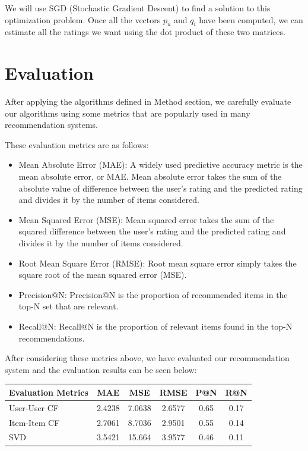 \documentclass[12pt,a4paper]{report}
\begin{document}
  We will use SGD (Stochastic Gradient Descent) to find a solution to this optimization problem. Once all the vectors $p_u$ and $q_i$ have been computed, we can estimate all the ratings we want using the dot product of these two matrices.
  

\chapter{Evaluation}

After applying the algorithms defined in Method section, we carefully evaluate our algorithms using some metrics that are popularly used in many recommendation systems.

These evaluation metrics are as follows: 
\vspace{-5mm}
\begin{itemize}
    \item Mean Absolute Error (MAE): A widely used predictive accuracy metric is the mean absolute error, or MAE. Mean absolute error takes the sum of the absolute value of difference between the user’s rating and the predicted rating and divides it by the number of items considered.
    \item Mean Squared Error (MSE):  Mean squared error takes the sum of the squared difference between the user’s rating and the predicted rating and divides it by the number of items considered.
    \item Root Mean Square Error (RMSE): Root mean square error simply takes the square root of the mean squared error (MSE).
    \item Precision@N: Precision@N is the proportion of recommended items in the top-N set that are relevant.
    \item Recall@N: Recall@N is the proportion of relevant items found in the top-N recommendations.
\end{itemize}

After considering these metrics above, we have evaluated our recommendation system and the evaluation results can be seen below:

\begin{table}[htp]
\begin{center}
\begin{tabular}{|p{5cm}|c|c|c|c|c|}
\hline
\textbf{Evaluation Metrics} & \textbf{MAE} & \textbf{MSE} & \textbf{RMSE} & \textbf{P@N} & \textbf{R@N} \\
\hline
User-User CF & 2.4238 & 7.0638 & 2.6577 & 0.65 & 0.17 \\
\hline
Item-Item CF & 2.7061 & 8.7036 & 2.9501 & 0.55 & 0.14 \\
\hline
SVD & 3.5421 & 15.664 & 3.9577 & 0.46 & 0.11 \\
\hline
\end{tabular}
\end{center}
\end{table}
\end{document}
